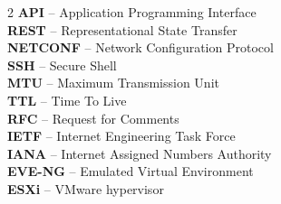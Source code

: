 \begin{multicols}{2}
\textbf{API} -- Application Programming Interface\\
\textbf{REST} -- Representational State Transfer\\
\textbf{NETCONF} -- Network Configuration Protocol\\
\textbf{SSH} -- Secure Shell\\
\textbf{MTU} -- Maximum Transmission Unit\\
\textbf{TTL} -- Time To Live\\
\textbf{RFC} -- Request for Comments\\
\textbf{IETF} -- Internet Engineering Task Force\\
\textbf{IANA} -- Internet Assigned Numbers Authority\\
\textbf{EVE-NG} -- Emulated Virtual Environment\\
\textbf{ESXi} -- VMware hypervisor\\

\end{multicols}